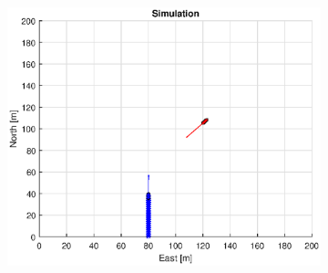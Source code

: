 \begin{figure}[!b]
\begin{subfigure}[b]{0.499\textwidth}
        \centering
        \includegraphics[width=\textwidth]{Images/Figures/sving_GW/Simple0_f600_Frame3}
    \end{subfigure}
    \hfill
\end{figure}%
